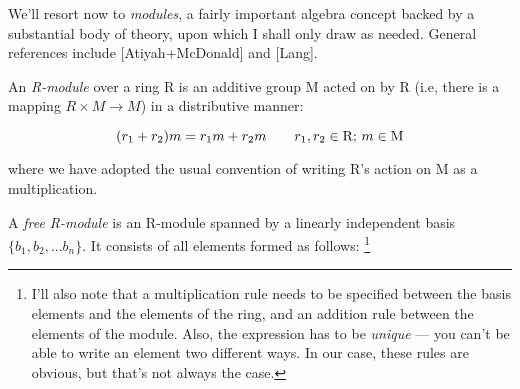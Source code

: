 %
%
%
%
%
%
%
%
%
%
%
%
%
%
%


We'll resort now to {\it modules}, a fairly important algebra concept
backed by a substantial body of theory, upon which I shall only draw
as needed.  General references include [Atiyah+McDonald] and [Lang].


An {\it R-module} over a ring R is an additive group M acted on by R
(i.e, there is a mapping $R \times M \to M$) in a distributive manner:

$$(r_1 + r_2)m = r_1 m + r_2 m \qquad r_1, r_2 \in {\rm R};\, m \in {\rm M}$$

where we have adopted the usual convention of writing R's action on M
as a multiplication.

\enddefinition


A {\it free R-module} is an R-module spanned by a linearly independent basis
$\{b_1, b_2, ... b_n\}$.  It consists of all elements formed as follows:
\footnote{I'll also note that a multiplication rule needs to be specified
between the basis elements and the elements of the ring, and an
addition rule between the elements of the module.  Also,
the expression has to be {\it unique} --- you can't be
able to write an element two different ways.  In our
case, these rules are obvious, but that's not always the case.}


